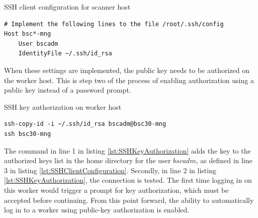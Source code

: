 \begin{listing}[!ht]
\caption{SSH client configuration for scanner host}
\label{lst:SSHClientConfiguration}
\begin{verbatim}
# Implement the following lines to the file /root/.ssh/config
Host bsc*-mng
    User bscadm
    IdentityFile ~/.ssh/id_rsa
\end{verbatim}
\end{listing}

When these settings are implemented, the public key needs to be authorized on the worker host.
This is step two of the process of enabling authorization using a public key instead of a password prompt.
\begin{listing}[!ht]
\caption{SSH key authorization on worker host}
\label{lst:SSHKeyAuthorization}
\begin{verbatim}
ssh-copy-id -i ~/.ssh/id_rsa bscadm@bsc30-mng
ssh bsc30-mng
\end{verbatim}
\end{listing}

The command in line 1 in listing \ref{lst:SSHKeyAuthorization} adds the key to the authorized keys list in the home directory for the user $bscadm$, as defined in line 3 in listing \ref{lst:SSHClientConfiguration}.
Secondly, in line 2 in listing \ref{lst:SSHKeyAuthorization}, the connection is tested.
The first time logging in on this worker would trigger a prompt for key authorization, which must be accepted before continuing.
From this point forward, the ability to automatically log in to a worker using public-key authorization is enabled.



